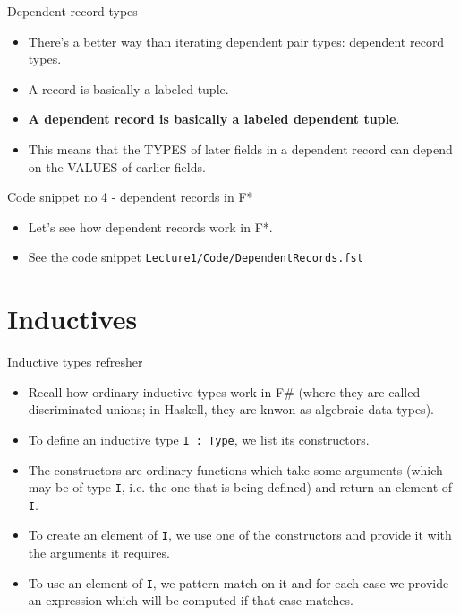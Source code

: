 \documentclass{beamer}
\newcommand{\m}[1]{\texttt{#1}}
\begin{document}
\begin{frame}{Dependent record types}
\begin{itemize}
	\item There's a better way than iterating dependent pair types: dependent record types.
	\item A record is basically a labeled tuple.
	\item \textbf{A dependent record is basically a labeled dependent tuple}.
	\item This means that the TYPES of later fields in a dependent record can depend on the VALUES of earlier fields.
\end{itemize}
\end{frame}

\begin{frame}{Code snippet no 4 - dependent records in F*}
\begin{itemize}
	\item Let's see how dependent records work in F*.
	\item See the code snippet \m{Lecture1/Code/DependentRecords.fst}
\end{itemize}
\end{frame}

\section{Inductives}

\begin{frame}{Inductive types refresher}
\begin{itemize}
	\item Recall how ordinary inductive types work in F\# (where they are called discriminated unions; in Haskell, they are knwon as algebraic data types).
	\item To define an inductive type \m{I :\ Type}, we list its constructors.
	\item The constructors are ordinary functions which take some arguments (which may be of type \m{I}, i.e. the one that is being defined) and return an element of \m{I}.
	\item To create an element of \m{I}, we use one of the constructors and provide it with the arguments it requires.
	\item To use an element of \m{I}, we pattern match on it and for each case we provide an expression which will be computed if that case matches.
\end{itemize}
\end{frame}
\end{document}
